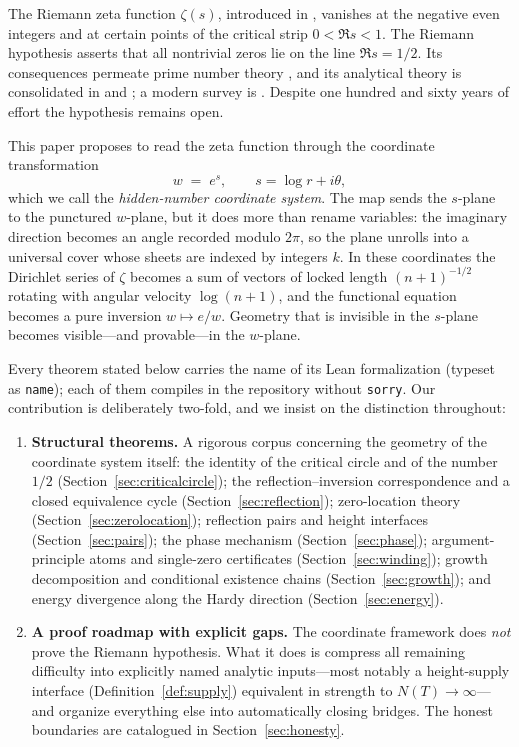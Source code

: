 \documentclass[submission]{jsfds}
\newcommand{\Lean}[1]{\texttt{#1}}
\begin{document}
The Riemann zeta function $\zeta(s)$, introduced in \cite{Riemann1859}, vanishes
at the negative even integers and at certain points of the critical strip
$0<\Re s<1$. The Riemann hypothesis asserts that all nontrivial zeros lie on the
line $\Re s=1/2$. Its consequences permeate prime number theory
\citep{vonMangoldt1905,Hadamard1893}, and its analytical theory is consolidated
in \citet{Titchmarsh1985} and \citet{Edwards1974}; a modern survey is
\citet{Conrey2003}. Despite one hundred and sixty years of effort the hypothesis
remains open.

This paper proposes to read the zeta function through the coordinate
transformation
\[
  w \;=\; e^{s}, \qquad s=\log r+i\theta ,
\]
which we call the \emph{hidden-number coordinate system}. The map sends the
$s$-plane to the punctured $w$-plane, but it does more than rename variables:
the imaginary direction becomes an angle recorded modulo $2\pi$, so the plane
unrolls into a universal cover whose sheets are indexed by integers $k$. In
these coordinates the Dirichlet series of $\zeta$ becomes a sum of vectors of
locked length $(n+1)^{-1/2}$ rotating with angular velocity $\log(n+1)$, and the
functional equation becomes a pure inversion $w\mapsto e/w$. Geometry that is
invisible in the $s$-plane becomes visible---and provable---in the $w$-plane.

Every theorem stated below carries the name of its Lean formalization
(typeset as \Lean{name}); each of them compiles in the repository without
\Lean{sorry}. Our contribution is deliberately two-fold, and we insist on the
distinction throughout:

\begin{enumerate}
\item \textbf{Structural theorems.} A rigorous corpus concerning the geometry of
the coordinate system itself: the identity of the critical circle and of the
number $1/2$ (Section~\ref{sec:criticalcircle}); the reflection--inversion
correspondence and a closed equivalence cycle (Section~\ref{sec:reflection});
zero-location theory (Section~\ref{sec:zerolocation}); reflection pairs and
height interfaces (Section~\ref{sec:pairs}); the phase mechanism
(Section~\ref{sec:phase}); argument-principle atoms and single-zero certificates
(Section~\ref{sec:winding}); growth decomposition and conditional existence
chains (Section~\ref{sec:growth}); and energy divergence along the Hardy
direction (Section~\ref{sec:energy}).
\item \textbf{A proof roadmap with explicit gaps.} The coordinate framework
does \emph{not} prove the Riemann hypothesis. What it does is compress all
remaining difficulty into explicitly named analytic inputs---most notably a
height-supply interface (Definition~\ref{def:supply}) equivalent in strength to
$N(T)\to\infty$---and organize everything else into automatically closing
bridges. The honest boundaries are catalogued in Section~\ref{sec:honesty}.
\end{enumerate}
\end{document}
